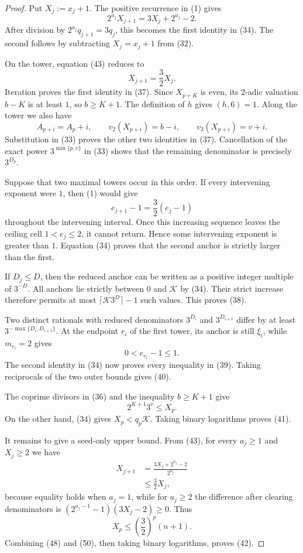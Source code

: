 \documentclass[11pt]{article}
\begin{document}
\begin{proof}
Put $X_j:=x_j+1$.  The positive recurrence in (1) gives
\[
  2^{a_j}X_{j+1}=3X_j+2^{a_j}-2.
  \tag{43}
\]
After division by $2^{a_j}q_{j+1}=3q_j$, this becomes the first identity
in (34).  The second follows by subtracting $X_j=x_j+1$ from (32).

On the tower, equation (43) reduces to
\[
  X_{j+1}=\frac32X_j.
  \tag{44}
\]
Iteration proves the first identity in (37).  Since $X_{p+K}$ is even, its
$2$-adic valuation $b-K$ is at least $1$, so $b\geq K+1$.  The definition
of $h$ gives $(h,6)=1$.  Along the tower we also have
\[
  A_{p+i}=A_p+i,
  \qquad
  v_2(X_{p+i})=b-i,
  \qquad
  v_3(X_{p+i})=v+i.
  \tag{45}
\]
Substitution in (33) proves the other two identities in (37).  Cancellation
of the exact power $3^{\min\{p,v\}}$ in (33) shows that the remaining
denominator is precisely $3^{D_p}$.

Suppose that two maximal towers occur in this order.  If every intervening
exponent were $1$, then (1) would give
\[
  e_{j+1}-1=\frac32(e_j-1)
  \tag{46}
\]
throughout the intervening interval.  Once this increasing sequence leaves
the ceiling cell $1<e_j\leq2$, it cannot return.  Hence some intervening
exponent is greater than $1$.  Equation (34) proves that the second anchor
is strictly larger than the first.

If $D_j\leq D$, then the reduced anchor can be written as a positive integer
multiple of $3^{-D}$.  All anchors lie strictly between $0$ and $\mathcal K$
by (34).  Their strict increase therefore permits at most
$\lceil\mathcal K3^D\rceil-1$ such values.  This proves (38).

Two distinct rationals with reduced denominators $3^{D_i}$ and
$3^{D_{i+1}}$ differ by at least
$3^{-\max\{D_i,D_{i+1}\}}$.  At the endpoint $r_i$ of the first tower,
its anchor is still $\xi_i$, while $m_{r_i}=2$ gives
\[
  0<e_{r_i}-1\leq1.
  \tag{47}
\]
The second identity in (34) now proves every inequality in (39).  Taking
reciprocals of the two outer bounds gives (40).

The coprime divisors in (36) and the inequality $b\geq K+1$ give
\[
  2^{K+1}3^v\leq X_p.
  \tag{48}
\]
On the other hand, (34) gives $X_p<q_p\mathcal K$.  Taking binary
logarithms proves (41).

It remains to give a seed-only upper bound.  From (43), for every $a_j\geq1$
and $X_j\geq2$ we have
\[
\begin{aligned}
  X_{j+1}
  &=\frac{3X_j+2^{a_j}-2}{2^{a_j}}\\
  &\leq\frac32X_j,
\end{aligned}
\tag{49}
\]
because equality holds when $a_j=1$, while for $a_j\geq2$ the difference
after clearing denominators is
$(2^{a_j-1}-1)(3X_j-2)\geq0$.  Thus
\[
  X_p\leq\left(\frac32\right)^p(n+1).
  \tag{50}
\]
Combining (48) and (50), then taking binary logarithms, proves (42).
\end{proof}
\end{document}
